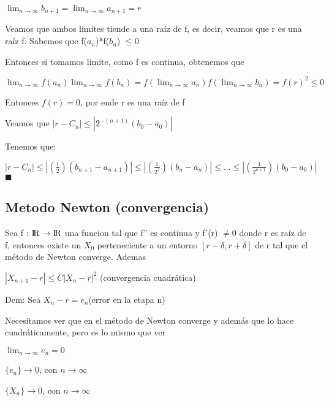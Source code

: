 \documentclass{article}
\begin{document}
$ \lim_{n \to \infty} b_{n+1} = \lim_{n \to \infty} a_{n+1} = r $

 \vspace{5mm}

Veamos que ambos limites tiende a una raíz de f, es decir, veamos que r es una raíz f. Sabemos que f($a_n$)*f($b_n$) $ \leq 0 $

Entonces si tomamos limite, como f es continua, obtenemos que

$ \lim_{n \to \infty} f(a_{n})\lim_{n \to \infty} f(b_{n}) = f(\lim_{n \to \infty} a_{n})f(\lim_{n \to \infty} b_{n}) = f(r)^2 \leq 0 $

Entonces $f(r) = 0$, por ende r es una raíz de f

Veamos que $| r - C_n | \leq | 2^{-(n+1)}(b_0 - a_0) |$

Tenemos que:

$\left| r - C_n \right| \leq \left| \left( \displaystyle\frac{1}{2} \right)(b_{n+1}-a_{n+1}) \right| \leq \left| \left( \displaystyle\frac{1}{2^2} \right)(b_{n}-a_{n}) \right| \leq ... \leq
 \left| \left( \displaystyle\frac{1}{2^{n+1}} \right)(b_0-a_0) \right| $ $\blacksquare$




 \vspace{5mm}


\subsection{Metodo Newton (convergencia)}\label{Metodo-Newton-(convergencia)}

Sea f : ${\rm I\!R} \rightarrow {\rm I\!R}$ una funcion tal que f'' es continua y f'(r) $ \not= 0$ donde r es raíz de f, 
entonces existe un $ X_0$ perteneciente a un entorno $ [r-\delta, r+\delta] $ de r tal que el método de Newton converge. Ademas

$\left| X_{n+1} - r  \right | \leq C \left | X_n -r  \right |^2 $ (convergencia cuadrática)

\vspace{5mm}


Dem: Sea $ X_n - r = e_n $(error en la etapa n)

Necesitamos ver que en el método de Newton converge y además que lo hace cuadráticamente, pero es lo mismo que ver

$ \lim_{n \to \infty} e_n = 0 $ 

 $\{ e_n \} \to 0$, con $ n \to \infty $

 $\{ X_n \} \to 0$, con $ n \to \infty $ 
\end{document}
